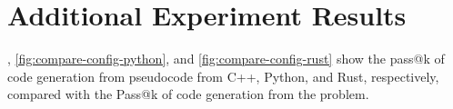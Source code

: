 \section{Additional Experiment Results}\label{sec:add-exp-results}
, \ref{fig:compare-config-python}, and \ref{fig:compare-config-rust} show the pass@k of code generation from pseudocode from C++, Python, and Rust, respectively, compared with the Pass@k of code generation from the problem.






















